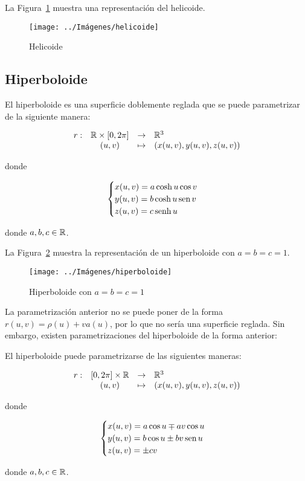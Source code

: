 \documentclass[10pt,a4paper]{article}
\begin{document}
La Figura~\ref{fig:helicoide} muestra una representación del helicoide.

\begin{figure}[hbtp]
	\centering
	\texttt{[image: ../Imágenes/helicoide]}
	\caption{Helicoide}
	\label{fig:helicoide}
\end{figure}

\subsection{Hiperboloide}

\begin{defi}

El hiperboloide es una superficie doblemente reglada que se puede parametrizar de la siguiente manera:

$$\begin{array}{rcll}
r : & \mathbb{R} \times [0, 2\pi] & \to & \mathbb{R}^3\\
& (u,v) & \mapsto & (x(u,v),y(u,v),z(u,v))
\end{array}$$

donde 

$$ \begin{cases}
x(u,v) = a \cosh u \cos v \\
y(u,v) = b \cosh u \mathop{\mbox{\normalfont sen}}\nolimits v \\
z(u,v) = c \mathop{\mbox{\normalfont senh}}\nolimits u
\end{cases} $$

donde $a, b, c \in \mathbb{R}$.

\end{defi}

La Figura~\ref{fig:hiperboloide} muestra la representación de un hiperboloide con $a = b = c = 1$.

\begin{figure}[htbp]
	\centering
	\texttt{[image: ../Imágenes/hiperboloide]}
	\caption{Hiperboloide con $a=b=c=1$}
	\label{fig:hiperboloide}
\end{figure}

La parametrización anterior no se puede poner de la forma $r(u,v) = \rho(u) + v a(u)$, por lo que no sería una superficie reglada. Sin embargo, existen parametrizaciones del hiperboloide de la forma anterior:

\begin{defi}
El hiperboloide puede parametrizarse de las siguientes maneras:

$$\begin{array}{rcll}
r : & [0, 2\pi] \times \mathbb{R} & \to & \mathbb{R}^3\\
& (u,v) & \mapsto & (x(u,v),y(u,v),z(u,v))
\end{array}$$

donde 

$$ \begin{cases}
x(u,v) = a \cos u \mp av\cos u \\
y(u,v) = b \cos u \pm bv\mathop{\mbox{\normalfont sen}}\nolimits u \\
z(u,v) = \pm c v
\end{cases} $$

donde $a, b, c \in \mathbb{R}$.

\end{defi}
\end{document}
